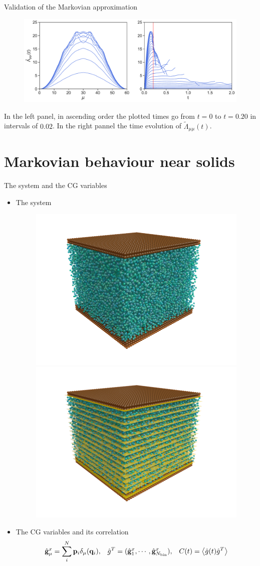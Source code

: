 \documentclass{beamer}
\newcommand{\llangle}{\left\langle}
\newcommand{\rrangle}{\right\rangle}
\begin{document}
\begin{frame}{Validation of the Markovian approximation}
\begin{figure}[h!]
\includegraphics[width=\linewidth]{LambdatFourier-PBC-defense}
\end{figure}
In  the left  panel, in
  ascending  order the  plotted times  go  from $t=0$  to $t=0.20$  in
  intervals of $0.02$.  In the right pannel the time evolution of $\tilde{\Lambda}_{\mu\mu}(t)$.
\end{frame}

\section{Markovian behaviour near solids}
\begin{frame}{The system and the CG variables}
\begin{itemize}
  \item The system
\begin{figure}
    \centering
    \includegraphics[width=0.45\linewidth]{PRL3_gold2_wo_layers_wo_diffuse}
    \includegraphics[width=0.45\linewidth]{PRL3_gold2_wo_diffuse}
\end{figure}
\item The CG variables and its correlation
\begin{align}
  \hat{\bf g}^x_\mu= \sum_i^N{\bf p}_i\delta_\mu({\bf q}_i), && 
  \hat{g}^T=(\hat{\bf   g}^x_1,\cdots,\hat{\bf  g}^x_{N_{\rm   bin}}), &&
  C(t)=\llangle \hat{g}(t) \hat{g}^T\rrangle 
\nonumber
\end{align}
\end{itemize}
\end{frame}
\end{document}
